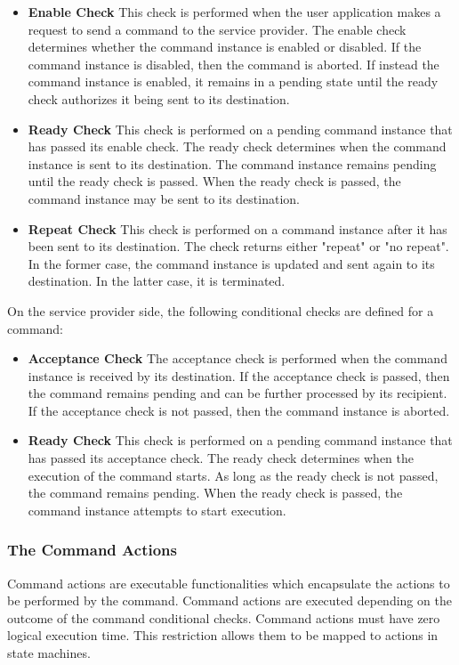 \begin{itemize}
\item \textbf{Enable Check}
This check is performed when the user application makes a request to send a command to the service provider. The enable check determines whether the command instance is enabled or disabled. If the command instance is disabled, then the command is aborted. If instead the command instance is enabled, it remains in a pending state until the ready check authorizes it being sent to its destination.

\item \textbf{Ready Check}
This check is performed on a pending command instance that has passed its enable check. The ready check determines when the command instance is sent to its destination.  The command instance remains pending until the ready check is passed. When the ready check is passed, the command instance may be sent to its destination. 

\item \textbf{Repeat Check}
This check is performed on a command instance after it has been sent to its destination. The check returns either "repeat" or "no repeat". In the former case, the command instance is updated and sent again to its destination. In the latter case, it is terminated.
\end{itemize}

On the service provider side, the following conditional checks are defined for a command:

\begin{itemize}
\item \textbf{Acceptance Check}
The acceptance check is performed when the command instance is received by its destination. If the acceptance check is passed, then the command remains pending and can be further processed by its recipient. If the acceptance check is not passed, then the command instance is aborted.

\item \textbf{Ready Check}
This check is performed on a pending command instance that has passed its acceptance check. The ready check determines when the execution of the command starts.  As long as the ready check is not passed, the command remains pending. When the ready check is passed, the command instance attempts to start execution.
\end{itemize}

\subsubsection{The Command Actions}\label{sec:CmdActions}
Command actions are executable functionalities which encapsulate the actions to be performed by the command. Command actions are executed depending on the outcome of the command conditional checks. Command actions must have zero logical execution time. This restriction allows them to be mapped to actions in state machines. 

